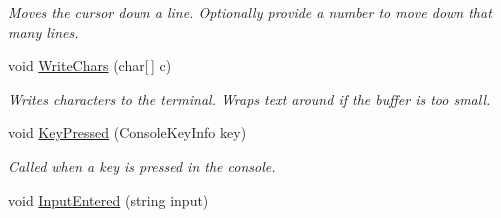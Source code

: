 \begin{DoxyCompactItemize}
\begin{DoxyCompactList}\small\item\em Moves the cursor down a line. Optionally provide a number to move down that many lines.\end{DoxyCompactList}\item 
\hypertarget{class_m_b_c_1_1_app_1_1_terminal_1_1_terminal_module_a035316d3e8c803a7f0f5c2ffe332fab3}{void \hyperlink{class_m_b_c_1_1_app_1_1_terminal_1_1_terminal_module_a035316d3e8c803a7f0f5c2ffe332fab3}{Write\-Chars} (char\mbox{[}$\,$\mbox{]} c)}\label{class_m_b_c_1_1_app_1_1_terminal_1_1_terminal_module_a035316d3e8c803a7f0f5c2ffe332fab3}

\begin{DoxyCompactList}\small\item\em Writes characters to the terminal. Wraps text around if the buffer is too small.\end{DoxyCompactList}\item 
\hypertarget{class_m_b_c_1_1_app_1_1_terminal_1_1_terminal_module_ad729a2c88e4d5b2df8a3ca381132327d}{void \hyperlink{class_m_b_c_1_1_app_1_1_terminal_1_1_terminal_module_ad729a2c88e4d5b2df8a3ca381132327d}{Key\-Pressed} (Console\-Key\-Info key)}\label{class_m_b_c_1_1_app_1_1_terminal_1_1_terminal_module_ad729a2c88e4d5b2df8a3ca381132327d}

\begin{DoxyCompactList}\small\item\em Called when a key is pressed in the console.\end{DoxyCompactList}\item 
\hypertarget{class_m_b_c_1_1_app_1_1_terminal_1_1_terminal_module_a75f7358913aa9fc925e7e91a45b3d4ce}{void \hyperlink{class_m_b_c_1_1_app_1_1_terminal_1_1_terminal_module_a75f7358913aa9fc925e7e91a45b3d4ce}{Input\-Entered} (string input)}\label{class_m_b_c_1_1_app_1_1_terminal_1_1_terminal_module_a75f7358913aa9fc925e7e91a45b3d4ce}


\end{DoxyCompactItemize}
